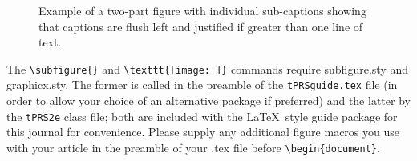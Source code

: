 \documentclass{tPRS2e}
\begin{document}
\begin{figure}
\begin{center}
\hspace{6pt}
\caption{Example of a two-part figure with individual sub-captions
 showing that captions are flush left and justified if greater
 than one line of text.} \label{sample-figure}
\end{center}
\end{figure}

The \verb"\subfigure{}" and \verb"\texttt{[image: ]}" commands require subfigure.sty and graphicx.sty.
The former is called in the preamble of the \texttt{tPRSguide.tex} file (in order to allow your choice of an alternative package if preferred)
and the latter by the \texttt{tPRS2e} class file; both are included with the \LaTeX\ style guide package for this journal for convenience.
Please supply any additional figure macros you use with your article in the preamble of your .tex file before \verb"\begin{document}".
\end{document}
